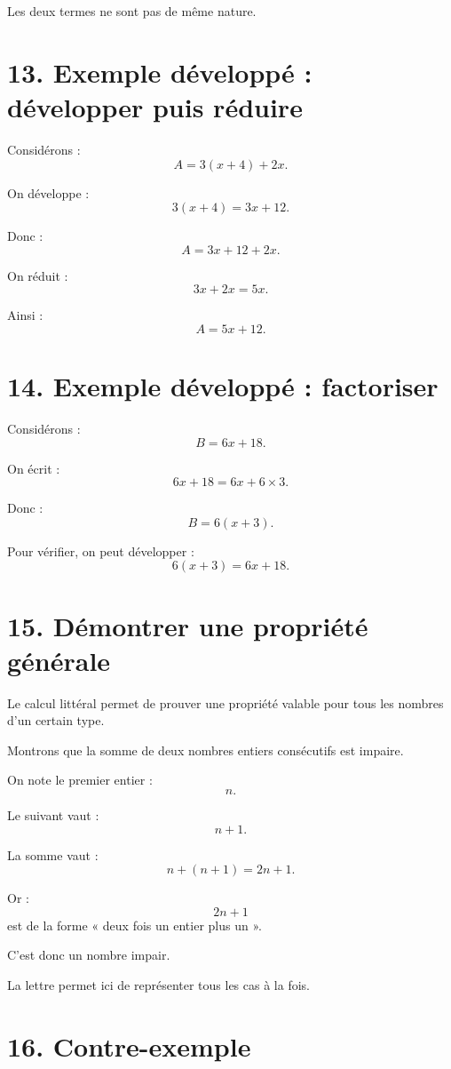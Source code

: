 Les deux termes ne sont pas de même nature.

\section{13. Exemple développé : développer puis réduire}

Considérons :
\[
A=3(x+4)+2x.
\]

On développe :
\[
3(x+4)=3x+12.
\]

Donc :
\[
A=3x+12+2x.
\]

On réduit :
\[
3x+2x=5x.
\]

Ainsi :
\[
\boxed{A=5x+12}.
\]

\section{14. Exemple développé : factoriser}

Considérons :
\[
B=6x+18.
\]

On écrit :
\[
6x+18
=
6x+6\times3.
\]

Donc :
\[
\boxed{B=6(x+3)}.
\]

Pour vérifier, on peut développer :
\[
6(x+3)=6x+18.
\]

\section{15. Démontrer une propriété générale}

Le calcul littéral permet de prouver une propriété valable pour tous les nombres d'un certain type.

\begin{exemple}
Montrons que la somme de deux nombres entiers consécutifs est impaire.

On note le premier entier :
\[
n.
\]

Le suivant vaut :
\[
n+1.
\]

La somme vaut :
\[
n+(n+1)=2n+1.
\]

Or :
\[
2n+1
\]
est de la forme « deux fois un entier plus un ».

C'est donc un nombre impair.
\end{exemple}

La lettre permet ici de représenter tous les cas à la fois.

\section{16. Contre-exemple}

